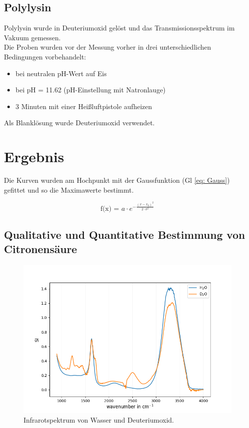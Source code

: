 \documentclass[10pt,a4paper]{article}
\begin{document}
	\subsection{Polylysin}
	Polylysin wurde in Deuteriumoxid gelöst und das Transmissionsspektrum im Vakuum gemessen.\\
	Die Proben wurden vor der Messung vorher in drei unterschiedlichen Bedingungen vorbehandelt:
	\begin{itemize}
		\item bei neutralen pH-Wert auf Eis
		\item bei pH = 11.62 (pH-Einstellung mit Natronlauge)
		\item 3 Minuten mit einer Heißluftpistole aufheizen
	\end{itemize}
	Als Blanklösung wurde Deuteriumoxid verwendet.
	
	
	
	\section{Ergebnis}
	Die Kurven wurden am Hochpunkt mit der Gaussfunktion (Gl \ref{eq: Gauss}) gefittet und so die Maximawerte bestimmt.

	\begin{equation}\label{eq: Gauss}
		\text{f(x) = } a \cdot e^{-\frac{(x-x_0)^2}{2 \cdot \sigma^2}}
	\end{equation}
	
	\subsection{Qualitative und Quantitative Bestimmung von Citronensäure}
	
		\begin{figure}[H]
			\centering
			\includegraphics[scale=0.85]{Onlywater.png}
			\caption{Infrarotspektrum von Wasser und Deuteriumoxid.}
			\label{fig:water}
		\end{figure}
	
\end{document}
